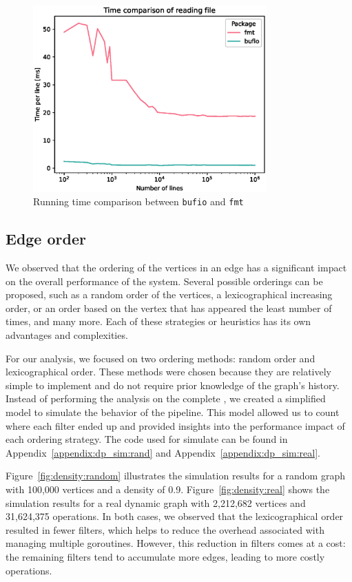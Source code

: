     \begin{figure}[H]
        \centering
        \includegraphics[width=0.8\textwidth]{figures/input_test.eps}
        \cprotect\caption{Running time comparison between \verb|bufio| and \verb|fmt|}
        \label{fig:input-test}
    \end{figure}

    
    \subsection*{Edge order \label{sec:edge_order}}
    We observed that the ordering of the vertices in an edge has a significant impact on the overall performance of the system. Several possible orderings can be proposed, such as a random order of the vertices, a lexicographical increasing order, or an order based on the vertex that has appeared the least number of times, and many more. Each of these strategies or heuristics has its own advantages and complexities.
    
    For our analysis, we focused on two ordering methods: random order and lexicographical order. These methods were chosen because they are relatively simple to implement and do not require prior knowledge of the graph's history. Instead of performing the analysis on the complete \DPmst, we created a simplified model to simulate the behavior of the pipeline. This model allowed us to count where each filter ended up and provided insights into the performance impact of each ordering strategy. The code used for simulate can be found in Appendix~\ref{appendix:dp_sim:rand} and Appendix~\ref{appendix:dp_sim:real}.

    Figure~\ref{fig:density:random} illustrates the simulation results for a random graph with 100,000 vertices and a density of 0.9. Figure~\ref{fig:density:real} shows the simulation results for a real dynamic graph with 2,212,682 vertices and 31,624,375 operations. In both cases, we observed that the lexicographical order resulted in fewer filters, which helps to reduce the overhead associated with managing multiple goroutines. However, this reduction in filters comes at a cost: the remaining filters tend to accumulate more edges, leading to more costly operations.
    
